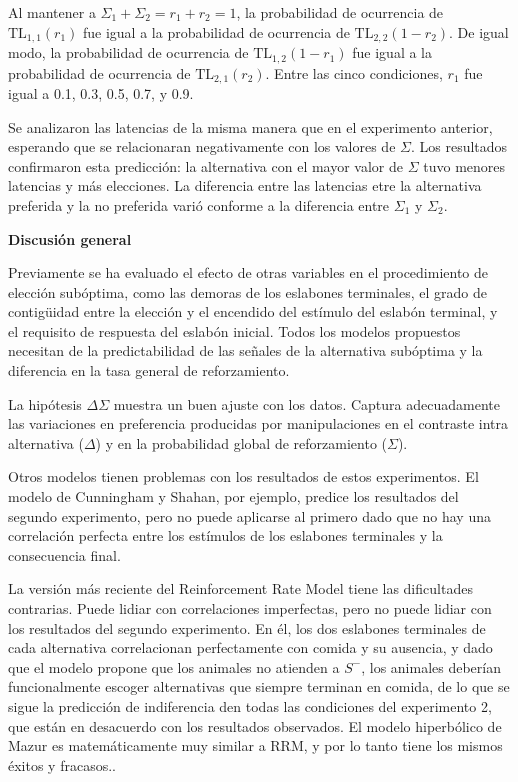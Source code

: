 \documentclass[a4paper,12pt]{article}
\begin{document}
Al mantener a $\Sigma_1+\Sigma_2=r_1+r_2=1$, la probabilidad de ocurrencia de $\mbox{TL}_{1,1}(r_1)$ fue igual a la probabilidad de ocurrencia de $\mbox{TL}_{2,2}(1-r_2)$. De igual modo, la probabilidad de ocurrencia de $\mbox{TL}_{1,2}(1-r_1)$ fue igual a la probabilidad de ocurrencia de $\mbox{TL}_{2,1}(r_2)$. Entre las cinco condiciones, $r_1$ fue igual a 0.1, 0.3, 0.5, 0.7, y 0.9.

Se analizaron las latencias de la misma manera que en el experimento anterior, esperando que se relacionaran negativamente con los valores de $\Sigma$. Los resultados confirmaron esta predicción: la alternativa con el mayor valor de $\Sigma$ tuvo menores latencias y más elecciones. La diferencia entre las latencias etre la alternativa preferida y la no preferida varió conforme a la diferencia entre $\Sigma_1$ y $\Sigma_2$.

{\bfseries Discusión general}

Previamente se ha evaluado el efecto de otras variables en el procedimiento de elección subóptima, como las demoras de los eslabones terminales, el grado de contigüidad entre la elección y el encendido del estímulo del eslabón terminal, y el requisito de respuesta del eslabón inicial. Todos los modelos propuestos necesitan de la predictabilidad de las señales de la alternativa subóptima y la diferencia en la tasa general de reforzamiento.

La hipótesis $\Delta\Sigma$ muestra un buen ajuste con los datos. Captura adecuadamente las variaciones en preferencia producidas por manipulaciones en el contraste intra alternativa ($\Delta$) y en la probabilidad global de reforzamiento ($\Sigma$).

Otros modelos tienen problemas con los resultados de estos experimentos. El modelo de Cunningham y Shahan, por ejemplo, predice los resultados del segundo experimento, pero no puede aplicarse al primero dado que no hay una correlación perfecta entre los estímulos de los eslabones terminales y la consecuencia final.

La versión  más reciente del Reinforcement Rate Model tiene las dificultades contrarias. Puede lidiar con correlaciones imperfectas, pero no puede lidiar con los resultados del segundo experimento. En él, los dos eslabones terminales de cada alternativa correlacionan perfectamente con comida y su ausencia, y dado que el modelo propone que los animales no atienden a $S^-$, los animales deberían funcionalmente escoger alternativas que siempre terminan en comida, de lo que se sigue la predicción de indiferencia den todas las condiciones del experimento 2, que están en desacuerdo con los resultados observados. El modelo hiperbólico de Mazur es matemáticamente muy similar a RRM, y por lo tanto tiene los mismos éxitos y fracasos..
\end{document}
